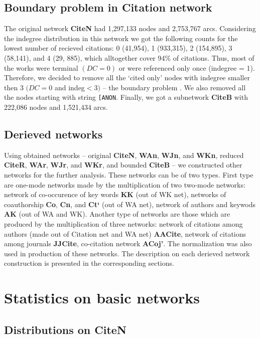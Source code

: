 \documentclass[11pt]{article} %
\newcommand{\Remark}[1]{\ifodd\value{page} \normalmarginpar
 \else \reversemarginpar \fi \marginpar{{\footnotesize #1}} }
\begin{document}
\subsection{Boundary problem in Citation network}

The original network \textbf{CiteN} had 1,297,133 nodes and 2,753,767 arcs. Considering the indegree distribution in this network we got the following  counts for the lowest number of recieved citations: 0 (41,954), 1 (933,315), 2 (154,895), 3 (58,141), and 4 (29, 885), which alltogether  cover 94\% of citations. Thus, most of the works were terminal $(DC=0)$ or were referenced only once (indegree = 1). Therefore, we decided to remove all the `cited only' nodes with indegree smaller then 3 $(DC = 0$ and indeg$<3)$ -- the boundary problem \citep{Understand}. We also removed all the nodes starting with string \texttt{[ANON}.  Finally, we got a subnetwork \textbf{CiteB} with  222,086 nodes and 1,521,434 arcs.
			
\subsection{Derieved networks}

\Remark{Move somewhere else}
Using obtained networks -- original \textbf{CiteN}, \textbf{WAn}, \textbf{WJn}, and \textbf{WKn}, reduced \textbf{CiteR}, \textbf{WAr}, \textbf{WJr}, and \textbf{WKr}, and bounded \textbf{CiteB} -- we constructed other networks for the further analysis. These networks can be of two types. First type are one-mode networks made by the multiplication of two two-mode networks: network of co-occurence of key words \textbf{KK} (out of WK net), networks of coauthorship \textbf{Co}, \textbf{Cn}, and \textbf{Ct`} (out of WA net), network of authors and keywods \textbf{AK} (out of WA and WK). Another type of networks are those which are produced by the multiplication of three networks: network of citations among authors (made out of Citation net and WA net) \textbf{AACite}, network of citations among journals \textbf{JJCite}, co-citation network \textbf{ACoj'}. The normalization was also used in production of these networks. The description on each derieved network construction is presented in the corresponding sections. 

\section{Statistics on basic networks}

\normalsize
\subsection{Distributions on CiteN}
\end{document}
